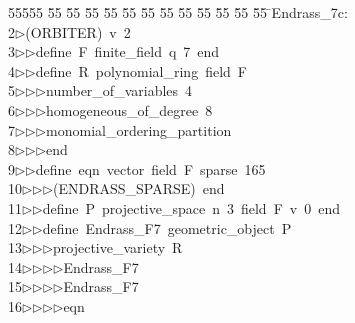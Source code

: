 %
%
\begin{tabbing}
55555 \= 55 \= 55 \= 55 \= 55 \= 55 \= 55 \= 55 \= 55 \= 55 \= 55 \= 55 \= 55 \= \>Endrass\_7c:\\[0pt]
2\>$\triangleright$\>(ORBITER)\ v\ 2\ \\[0pt]
3\>$\triangleright$\>$\triangleright$\>define\ F\ finite\_field\ q\ 7\ end\ \\[0pt]
4\>$\triangleright$\>$\triangleright$\>define\ R\ polynomial\_ring\ field\ F\ \\[0pt]
5\>$\triangleright$\>$\triangleright$\>$\triangleright$\>number\_of\_variables\ 4\ \\[0pt]
6\>$\triangleright$\>$\triangleright$\>$\triangleright$\>homogeneous\_of\_degree\ 8\ \\[0pt]
7\>$\triangleright$\>$\triangleright$\>$\triangleright$\>monomial\_ordering\_partition\ \\[0pt]
8\>$\triangleright$\>$\triangleright$\>$\triangleright$\>end\ \\[0pt]
9\>$\triangleright$\>$\triangleright$\>define\ eqn\ vector\ field\ F\ sparse\ 165\ \\[0pt]
10\>$\triangleright$\>$\triangleright$\>$\triangleright$\>(ENDRASS\_SPARSE)\ end\ \\[0pt]
11\>$\triangleright$\>$\triangleright$\>define\ P\ projective\_space\ n\ 3\ field\ F\ v\ 0\ end\ \\[0pt]
12\>$\triangleright$\>$\triangleright$\>define\ Endrass\_F7\ geometric\_object\ P\ \\[0pt]
13\>$\triangleright$\>$\triangleright$\>$\triangleright$\>projective\_variety\ R\ \\[0pt]
14\>$\triangleright$\>$\triangleright$\>$\triangleright$\>$\triangleright$\>Endrass\_F7\ \\[0pt]
15\>$\triangleright$\>$\triangleright$\>$\triangleright$\>$\triangleright$\>Endrass\_F7\ \\[0pt]
16\>$\triangleright$\>$\triangleright$\>$\triangleright$\>$\triangleright$\>eqn\ \\[0pt]

\end{tabbing}
